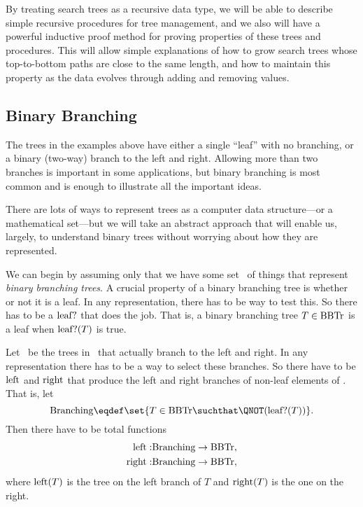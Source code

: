 By treating search trees as a recursive data type, we will be able to
describe simple recursive procedures for tree management, and we also
will have a powerful inductive proof method for proving properties of
these trees and procedures.  This will allow simple explanations of
how to grow search trees whose top-to-bottom paths are close to the
same length, and how to maintain this property as the data evolves
through adding and removing values.

\subsection{Binary Branching}

The trees in the examples above have either a single ``leaf'' with no
branching, or a binary (two-way) branch to the left and right.
Allowing more than two branches is important in some applications, but
binary branching is most common and is enough to illustrate all the
important ideas.

There are lots of ways to represent trees as a computer data
structure---or a mathematical set---but we will take an abstract
approach that will enable us, largely, to understand binary trees
without worrying about how they are represented.

We can begin by assuming only that we have some set \brnch\ of things
that represent \emph{binary branching trees}.  A crucial property of a
binary branching tree is whether or not it is a leaf.  In any
representation, there has to be way to test this.  So there has to be
a  $\leafp{}$ that does the job.  That is, a
binary branching tree $T \in \text{BBTr}$ is a leaf when $\text{leaf?}(T)$ is
true.

\iffalse
 We define the
\term{leaves} to be elements that $\leafp{}$ picks out:
\[
\leafset \eqdef \set{T \in \brnch \suchthat \leafp{(T)}}.
\]

So the official definition of ``leaf'' is ``element of the set \leafset.''
\fi

Let \brnchng\ be the trees in \brnch\ that actually branch to the left
and right.  In any representation there has to be a way to select
these branches.  So there have to be 
$\text{left}$ and $\text{right}$ that produce the left and right
branches of non-leaf elements of \brnch.  That is, let
\[
\brnchng \eqdef \set{T \in \brnch \suchthat \QNOT(\leafp{(T)})}.
\]
Then there have to be total functions
\begin{align*}
\text{left}: & \text{Branching} \to \text{BBTr},\\
\text{right}:& \text{Branching} \to \text{BBTr},
\end{align*}
where $\text{left}(T)$ is the tree on the left branch of $T$ and
$\text{right}(T)$ is the one on the right.

